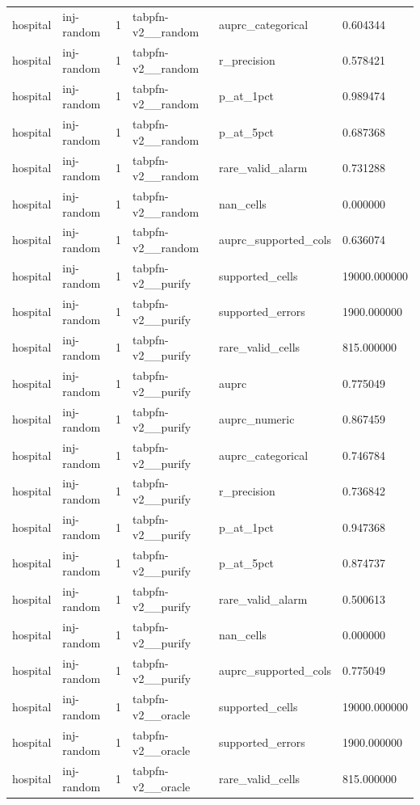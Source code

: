 \begin{tabular}{llllll}
hospital & inj-random & 1 & tabpfn-v2\_\_random & auprc\_categorical & 0.604344 \\
hospital & inj-random & 1 & tabpfn-v2\_\_random & r\_precision & 0.578421 \\
hospital & inj-random & 1 & tabpfn-v2\_\_random & p\_at\_1pct & 0.989474 \\
hospital & inj-random & 1 & tabpfn-v2\_\_random & p\_at\_5pct & 0.687368 \\
hospital & inj-random & 1 & tabpfn-v2\_\_random & rare\_valid\_alarm & 0.731288 \\
hospital & inj-random & 1 & tabpfn-v2\_\_random & nan\_cells & 0.000000 \\
hospital & inj-random & 1 & tabpfn-v2\_\_random & auprc\_supported\_cols & 0.636074 \\
hospital & inj-random & 1 & tabpfn-v2\_\_purify & supported\_cells & 19000.000000 \\
hospital & inj-random & 1 & tabpfn-v2\_\_purify & supported\_errors & 1900.000000 \\
hospital & inj-random & 1 & tabpfn-v2\_\_purify & rare\_valid\_cells & 815.000000 \\
hospital & inj-random & 1 & tabpfn-v2\_\_purify & auprc & 0.775049 \\
hospital & inj-random & 1 & tabpfn-v2\_\_purify & auprc\_numeric & 0.867459 \\
hospital & inj-random & 1 & tabpfn-v2\_\_purify & auprc\_categorical & 0.746784 \\
hospital & inj-random & 1 & tabpfn-v2\_\_purify & r\_precision & 0.736842 \\
hospital & inj-random & 1 & tabpfn-v2\_\_purify & p\_at\_1pct & 0.947368 \\
hospital & inj-random & 1 & tabpfn-v2\_\_purify & p\_at\_5pct & 0.874737 \\
hospital & inj-random & 1 & tabpfn-v2\_\_purify & rare\_valid\_alarm & 0.500613 \\
hospital & inj-random & 1 & tabpfn-v2\_\_purify & nan\_cells & 0.000000 \\
hospital & inj-random & 1 & tabpfn-v2\_\_purify & auprc\_supported\_cols & 0.775049 \\
hospital & inj-random & 1 & tabpfn-v2\_\_oracle & supported\_cells & 19000.000000 \\
hospital & inj-random & 1 & tabpfn-v2\_\_oracle & supported\_errors & 1900.000000 \\
hospital & inj-random & 1 & tabpfn-v2\_\_oracle & rare\_valid\_cells & 815.000000 \\

\end{tabular}
